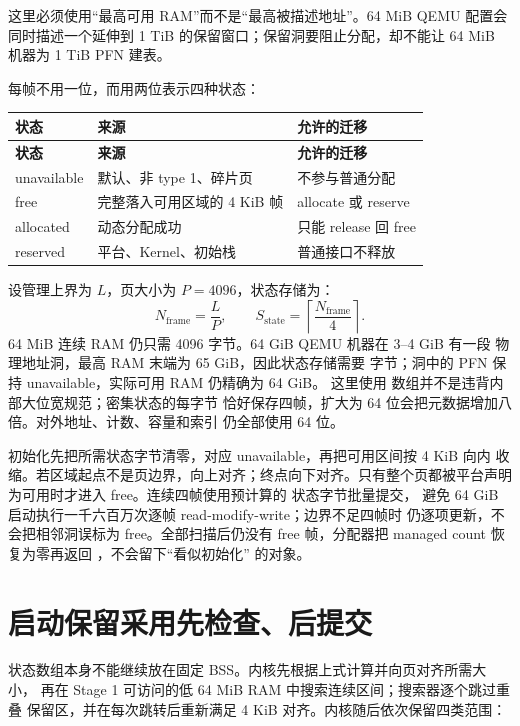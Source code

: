 这里必须使用“最高可用 RAM”而不是“最高被描述地址”。64 MiB QEMU 配置会
同时描述一个延伸到 1 TiB 的保留窗口；保留洞要阻止分配，却不能让 64 MiB
机器为 1 TiB PFN 建表。

每帧不用一位，而用两位表示四种状态：

\begin{longtable}{L{0.18\textwidth}L{0.25\textwidth}L{0.43\textwidth}}
\toprule
\textbf{状态} & \textbf{来源} & \textbf{允许的迁移}\\
\midrule
\endfirsthead
\toprule
\textbf{状态} & \textbf{来源} & \textbf{允许的迁移}\\
\midrule
\endhead
unavailable & 默认、非 type 1、碎片页 & 不参与普通分配\\
free & 完整落入可用区域的 4 KiB 帧 & allocate 或 reserve\\
allocated & 动态分配成功 & 只能 release 回 free\\
reserved & 平台、Kernel、初始栈 & 普通接口不释放\\
\bottomrule
\end{longtable}

设管理上界为 \(L\)，页大小为 \(P=4096\)，状态存储为：
\[
  N_{\mathrm{frame}}=\frac{L}{P},\qquad
  S_{\mathrm{state}}=
  \left\lceil\frac{N_{\mathrm{frame}}}{4}\right\rceil.
\]
64 MiB 连续 RAM 仍只需 4096 字节。64 GiB QEMU 机器在 3--4 GiB 有一段
物理地址洞，最高 RAM 末端为 65 GiB，因此状态存储需要
 字节；洞中的 PFN 保持 unavailable，实际可用 RAM 仍精确为
64 GiB。
这里使用  数组并不是违背内部大位宽规范；密集状态的每字节
恰好保存四帧，扩大为 64 位会把元数据增加八倍。对外地址、计数、容量和索引
仍全部使用 64 位。

初始化先把所需状态字节清零，对应 unavailable，再把可用区间按 4 KiB 向内
收缩。若区域起点不是页边界，向上对齐；终点向下对齐。只有整个页都被平台声明
为可用时才进入 free。连续四帧使用预计算的  状态字节批量提交，
避免 64 GiB 启动执行一千六百万次逐帧 read-modify-write；边界不足四帧时
仍逐项更新，不会把相邻洞误标为 free。全部扫描后仍没有 free 帧，分配器把
managed count 恢复为零再返回 ，不会留下“看似初始化”
的对象。

\section{启动保留采用先检查、后提交}

状态数组本身不能继续放在固定 BSS。内核先根据上式计算并向页对齐所需大小，
再在 Stage 1 可访问的低 64 MiB RAM 中搜索连续区间；搜索器逐个跳过重叠
保留区，并在每次跳转后重新满足 4 KiB 对齐。内核随后依次保留四类范围：

